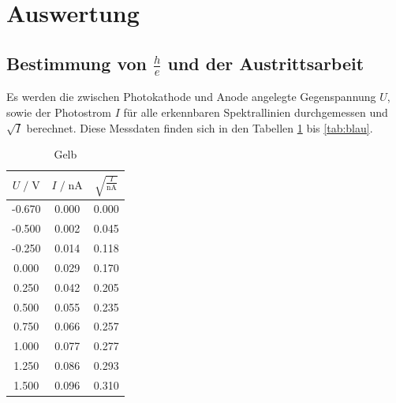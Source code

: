 \section{Auswertung}
\label{sec:Auswertung}

\subsection{Bestimmung von $\frac{h}{e}$ und der Austrittsarbeit}

Es werden die zwischen Photokathode und Anode angelegte Gegenspannung $U$, sowie der 
Photostrom $I$ für alle erkennbaren Spektrallinien durchgemessen und $\sqrt{I}$ berechnet. 
Diese Messdaten finden sich in den Tabellen \ref{tab:gelb} bis \ref{tab:blau}. 

\begin{table}
    \centering
    \caption{Gelb}
    \label{tab:gelb}
    \begin{tabular}{c c c}
    \toprule
    $ U \;/\; \si{\volt} $ & $I \;/\; \si{\nano\ampere}$ &
    $ \sqrt{\frac{I}{\si{\nano\ampere}}}$\\
    \midrule 
      -0.670 & 0.000 & 0.000\\
      -0.500 & 0.002 & 0.045\\
      -0.250 & 0.014 & 0.118\\
       0.000 & 0.029 & 0.170\\
       0.250 & 0.042 & 0.205\\
       0.500 & 0.055 & 0.235\\
       0.750 & 0.066 & 0.257\\
       1.000 & 0.077 & 0.277\\
       1.250 & 0.086 & 0.293\\
       1.500 & 0.096 & 0.310\\        
    \bottomrule
    \end{tabular}
\end{table}

